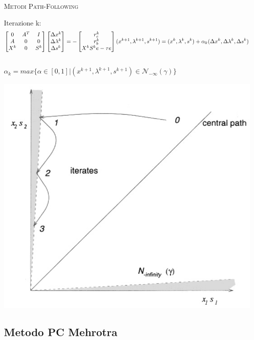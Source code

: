 
\begin{frame}[t]{\textsc{\LARGE \textcolor{burntumber}{Metodi Path-Following}}}
\begin{block}{Iterazione k:}
	\begin{equation*}	
	\begin{bmatrix}
	0&A^{T}&I \\A& 0&0\\X^{k}&0&S^{k}
	\end{bmatrix}\begin{bmatrix}
	\Delta x^{k}\\\Delta\lambda^{k} \\\Delta s^{k}
	\end{bmatrix}=-\begin{bmatrix}
	r_{c}^{k}\\r_{b}^{k}\\X^{k}S^{k}e-\tau e
	\end{bmatrix}\\
	(x^{k+1}, \lambda^{k+1}, s^{k+1}) = (x^{k}, \lambda^{k}, s^{k})+ \alpha_{k}(\Delta x^{k}, \Delta\lambda^{k}, \Delta s^{k})
	\end{equation*}\\
	$ \alpha_{k} = max\{\alpha \in[0,1]|(x^{k+1}, \lambda^{k+1}, s^{k+1})\in\mathcal{N}_{-\infty}(\gamma)\}$
\end{block}
\pause
\centering \includegraphics[width = 4 cm]{LPF.PNG}	
\end{frame}


\subsection{Metodo PC Mehrotra}


